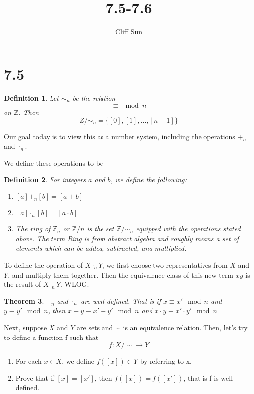 \documentclass{article}
\title{7.5-7.6}
\author{Cliff Sun}
\newtheorem{theorem}{Theorem}[section]
\newtheorem{definition}[theorem]{Definition}
\begin{document}
\maketitle

\section*{7.5}

\begin{definition}
    Let $\sim_n$ be the relation 
    \begin{equation}
        \equiv \mod n
    \end{equation}
    on $\mathbb{Z}$. Then
    \begin{equation}
        Z/\sim_n = \{[0], [1], \dots, [n-1]\}
    \end{equation}
\end{definition}

Our goal today is to view this as a number system, including the operations $+_n$ and $\cdot_n$.

We define these operations to be 

\begin{definition}
    For integers $a$ and $b$, we define the following:
    \begin{enumerate}
        \item $[a] +_n [b] = [a+b]$
        \item $[a] \cdot_n [b] = [a \cdot b]$
        \item The \underline{ring} of $\mathbb{Z}_n$ or $\mathbb{Z}/n$ is the set $\mathbb{Z}/\sim_n$ equipped with the operations stated above. The term \underline{Ring} is from abstract algebra and roughly means a set of elements which can be added, subtracted, and multiplied. 
\end{enumerate}
\end{definition}

To define the operation of $X \cdot_n Y$, we first choose two representatives from $X$ and $Y$, and multiply them together. Then the equivalence class of this new term $xy$ is the result of $X \cdot_n Y$. WLOG. 

\begin{theorem}
    $+_n$ and $\cdot_n$ are well-defined. That is if $x \equiv x' \mod n$ and $y \equiv y' \mod n$, then $x + y \equiv x' + y' \mod n$ and $x \cdot y \equiv x' \cdot y' \mod n$
\end{theorem}

Next, suppose $X$ and $Y$ are sets and $\sim$ is an equivalence relation. Then, let's try to define a function f such that 
\begin{equation}
    f: X/\sim \rightarrow Y
\end{equation}
\begin{enumerate}
    \item For each $x \in X$, we define $f([x]) \in Y$ by referring to x. 
    \item Prove that if $[x] = [x']$, then $f([x]) = f([x'])$, that is f is well-defined. 
\end{enumerate}
\end{document}

